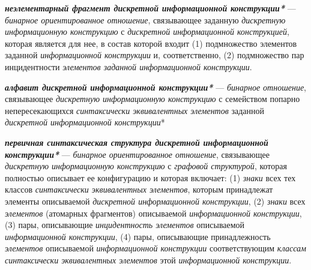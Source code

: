 \begin{SCn}


\end{SCn}

\textbf{\textit{неэлементарный фрагмент дискретной информационной конструкции*}} --- \textit{бинарное ориентированное отношение}, связывающее заданную \textit{дискретную информационную конструкцию} с \textit{дискретной информационной конструкцией}, которая является  для нее, в состав которой входит (1) подмножество элементов заданной \textit{информационной конструкции} и, соответственно, (2) подмножество пар инцидентности \textit{элементов заданной информационной конструкции}.

\textbf{\textit{алфавит дискретной информационной конструкции*}} --- \textit{бинарное отношение}, связывающее \textit{дискретную информационную конструкцию} с семейством попарно непересекающихся \textit{ синтаксически эквивалентных элементов} заданной \textit{дискретной информационной конструкции}*

\textbf{\textit{первичная синтаксическая структура дискретной информационной конструкции*}} --- \textit{бинарное ориентированное отношение}, связывающее \textit{дискретную информационную конструкцию} с \textit{графовой структурой}, которая полностью описывает ее конфигурацию и которая включает: (1) \textit{знаки} всех тех классов \textit{синтаксически эквивалентных элементов}, которым принадлежат элементы описываемой \textit{дискретной информационной конструкции}, (2) \textit{знаки} всех \textit{элементов} (атомарных фрагментов) описываемой \textit{информационной конструкции}, (3) пары, описывающие \textit{инцидентность элементов} описываемой \textit{информационной конструкции}, (4) пары, описывающие принадлежность \textit{элементов} описываемой \textit{информационной конструкции} соответствующим \textit{классам синтаксически эквивалентных элементов} этой \textit{информационной конструкции}.

